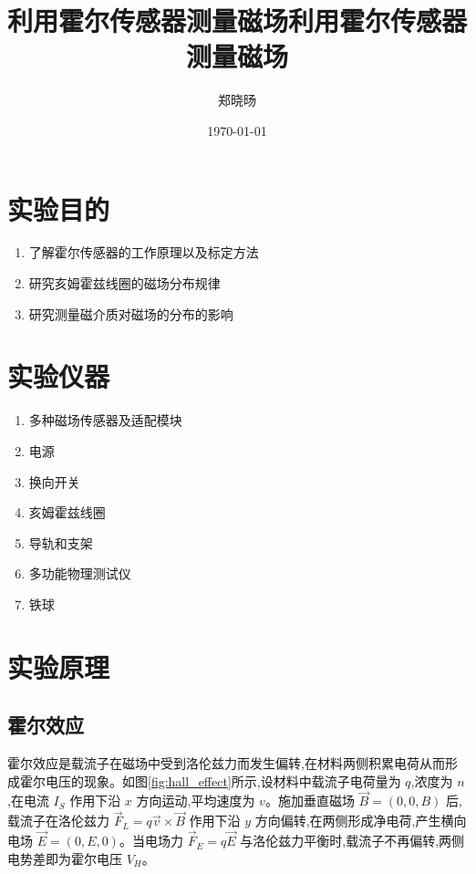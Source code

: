 \documentclass[UTF8]{ctexart}
\title{利用霍尔传感器测量磁场}
\title{利用霍尔传感器测量磁场}
\author{郑晓旸}
\date{\today}
\begin{document}
\fancyfoot[C]{\thepage}

\maketitle
\tableofcontents
\newpage

\section{实验目的}
    \begin{enumerate}
        \item 了解霍尔传感器的工作原理以及标定方法
        \item 研究亥姆霍兹线圈的磁场分布规律 
        \item 研究测量磁介质对磁场的分布的影响
    \end{enumerate}

\section{实验仪器}
    \begin{enumerate}
        \item 多种磁场传感器及适配模块
        \item 电源
        \item 换向开关
        \item 亥姆霍兹线圈
        \item 导轨和支架
        \item 多功能物理测试仪
        \item 铁球
    \end{enumerate}

    \section{实验原理}

    \subsection{霍尔效应}
    
    霍尔效应是载流子在磁场中受到洛伦兹力而发生偏转,在材料两侧积累电荷从而形成霍尔电压的现象。如图\ref{fig:hall_effect}所示,设材料中载流子电荷量为 $q$,浓度为 $n$,在电流 $I_S$ 作用下沿 $x$ 方向运动,平均速度为 $v$。施加垂直磁场 $\vec{B}=(0,0,B)$ 后,载流子在洛伦兹力 $\vec{F}_L=q\vec{v}\times\vec{B}$ 作用下沿 $y$ 方向偏转,在两侧形成净电荷,产生横向电场 $\vec{E}=(0,E,0)$。当电场力 $\vec{F}_E=q\vec{E}$ 与洛伦兹力平衡时,载流子不再偏转,两侧电势差即为霍尔电压 $V_H$。
    
\end{document}
